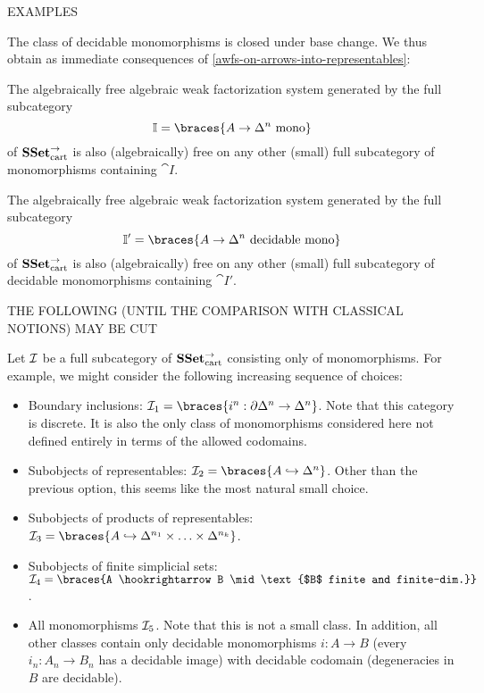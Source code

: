 \documentclass[reqno,10pt,a4paper,oneside]{amsart}
\begin{document}
EXAMPLES







The class of decidable monomorphisms is closed under base change.
We thus obtain as immediate consequences of \cref{awfs-on-arrows-into-representables}:

\begin{corollary}
\label{monos-into-representables}
The algebraically free algebraic weak factorization system generated by the full subcategory
\[\cat{I} = \braces{A \to \Delta^n\ \text{\normalfont{mono}}}\]
of $\SSetCart$ is also (algebraically) free on any other (small) full subcategory of monomorphisms containing $\cat{I}$.
\end{corollary}

\begin{corollary}
\label{decidable-monos-into-representables}
The algebraically free algebraic weak factorization system generated by the full subcategory
\[\cat{I}' = \braces{A \to \Delta^n\ \text{\normalfont{decidable mono}}}\]
of $\SSetCart$ is also (algebraically) free on any other (small) full subcategory of decidable monomorphisms containing $\cat{I}'$.
\end{corollary}


THE FOLLOWING (UNTIL THE COMPARISON WITH CLASSICAL NOTIONS) MAY BE CUT

Let $\cal{I}$ be a full subcategory of $\SSetCart$ consisting only of monomorphisms.
For example, we might consider the following increasing sequence of choices:
\begin{itemize}
\item
Boundary inclusions: $\cal{I}_1 = \braces{i^n : \partial \Delta^n \to \Delta^n}$.
Note that this category is discrete.
It is also the only class of monomorphisms considered here not defined entirely in terms of the allowed codomains.
\item
Subobjects of representables: $\cal{I}_2 = \braces{A \hookrightarrow \Delta^n}$.
Other than the previous option, this seems like the most natural small choice.
\item
Subobjects of products of representables: $\cal{I}_3 = \braces{A \hookrightarrow \Delta^{n_1} \times \ldots \times \Delta^{n_k}}$.
\item
Subobjects of finite simplicial sets: $\cal{I}_4 = \braces{A \hookrightarrow B \mid \text{$B$ finite and finite-dim.}}$.
\item
All monomorphisms $\cal{I}_5$.
Note that this is not a small class.
In addition, all other classes contain only decidable monomorphisms $i : A \to B$ (\ie every $i_n : A_n \to B_n$ has a decidable image) with decidable codomain (\ie degeneracies in $B$ are decidable).
\end{itemize}
\end{document}
